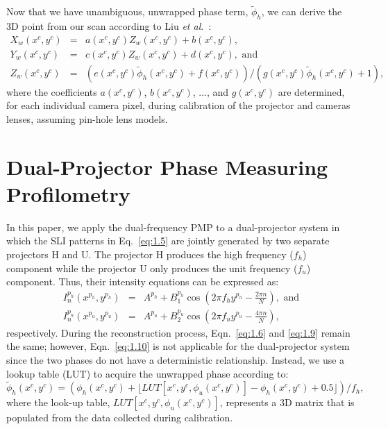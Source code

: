 \documentclass[]{spie}  %
\begin{document}
Now that we have unambiguous, unwrapped phase term, $\tilde{\phi}_h$, we can derive the 3D point from our scan according to Liu \textit{et al}.~\cite{liuk10}:
\begin{eqnarray}
X_w(x^c, y^c) & = & a(x^c, y^c) Z_w(x^c, y^c) + b(x^c, y^c), \label{xwEqn} \\
Y_w(x^c, y^c) & = & c(x^c, y^c) Z_w(x^c, y^c) + d(x^c, y^c), \mbox{ and} \label{ywEqn} \\
Z_w(x^c, y^c) & = & (e(x^c, y^c) \tilde{\phi}_h(x^c, y^c) + f(x^c, y^c))/(g(x^c, y^c) \tilde{\phi}_h(x^c, y^c) + 1), \label{zwEqn} 
\end{eqnarray}
where the coefficients $a(x^c, y^c)$, $b(x^c, y^c)$, ..., and $g(x^c, y^c)$ are determined, for each individual camera pixel, during calibration of the projector and cameras lenses, assuming pin-hole lens models.

\section{Dual-Projector Phase Measuring Profilometry}
In this paper, we apply the dual-frequency PMP to a dual-projector system in which the SLI patterns in Eq.~\eqref{eq:1.5} are jointly generated by two separate projectors H and U. The projector H produces the high frequency ($f_h$) component while the projector U only produces the unit frequency ($f_u$) component. Thus, their intensity equations can be expressed as:
\begin{eqnarray}
I^{p_h}_n(x^{p_h}, y^{p_h}) & = & A^{p_h} + B^{p_h}_1\cos\left(2\pi f_h y^{p_h} - \frac{2\pi n}{N}\right),\mbox{ and}\label{eq:1.14}\\
I^{p_u}_n(x^{p_u}, y^{p_u}) & = & A^{p_u} + B^{p_u}_2\cos\left(2\pi f_u y^{p_u} - \frac{4\pi n}{N}\right),\label{eq:1.15}
\end{eqnarray}
respectively. During the reconstruction process, Eqn.~\eqref{eq:1.6} and \eqref{eq:1.9} remain the same; however, Eqn.~\eqref{eq:1.10} is not applicable for the dual-projector system since the two phases do not have a deterministic relationship.  Instead, we use a lookup table (LUT) to acquire the unwrapped phase according to:
\begin{equation} \label{eq:1.16}
\tilde{\phi}_h(x^c, y^c) = \left( \phi_h(x^c, y^c) + \lfloor LUT[x^c, y^c, \phi_u(x^c, y^c)] - \phi_h(x^c, y^c) + 0.5 \rfloor \right)/f_h,
\end{equation}
where the look-up table, $LUT[x^c, y^c, \phi_u(x^c, y^c)]$, represents a 3D matrix that is populated from the data collected during calibration.
\end{document}
